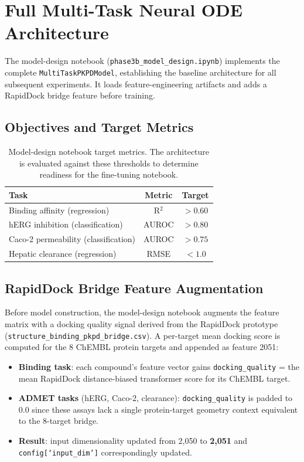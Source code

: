 \documentclass[a4paper,11pt,twoside]{report}
\begin{document}
\section{Full Multi-Task Neural ODE Architecture}
\label{sec:phase3b}

The model-design notebook (\texttt{phase3b\_model\_design.ipynb}) implements the complete \texttt{MultiTaskPKPDModel}, establishing the baseline architecture for all subsequent experiments. It loads feature-engineering artifacts and adds a RapidDock bridge feature before training.

\subsection{Objectives and Target Metrics}

\begin{table}[htbp]
\centering
\small
\caption{Model-design notebook target metrics. The architecture is evaluated against these thresholds to determine readiness for the fine-tuning notebook.}
\label{tab:phase3b_targets}
\begin{tabular}{l|c|c}
\hline
\textbf{Task} & \textbf{Metric} & \textbf{Target} \\
\hline
Binding affinity (regression) & R$^2$ & $> 0.60$ \\
hERG inhibition (classification) & AUROC & $> 0.80$ \\
Caco-2 permeability (classification) & AUROC & $> 0.75$ \\
Hepatic clearance (regression) & RMSE & $< 1.0$ \\
\hline
\end{tabular}
\end{table}

\subsection{RapidDock Bridge Feature Augmentation}

Before model construction, the model-design notebook augments the feature matrix with a docking quality signal derived from the RapidDock prototype (\texttt{structure\_binding\_pkpd\_bridge.csv}). A per-target mean docking score is computed for the 8 ChEMBL protein targets and appended as feature 2051:
\begin{itemize}
  \item \textbf{Binding task}: each compound's feature vector gains \texttt{docking\_quality} = the mean RapidDock distance-biased transformer score for its ChEMBL target.
  \item \textbf{ADMET tasks} (hERG, Caco-2, clearance): \texttt{docking\_quality} is padded to $0.0$ since these assays lack a single protein-target geometry context equivalent to the 8-target bridge.
  \item \textbf{Result}: input dimensionality updated from 2,050 to \textbf{2,051} and \texttt{config[`input\_dim']} correspondingly updated.
\end{itemize}
\end{document}
